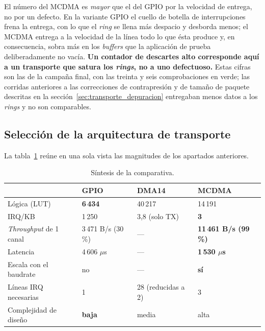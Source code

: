 El número del MCDMA es \textit{mayor} que el del GPIO por la velocidad de entrega, no por un
defecto. En la variante GPIO el cuello de botella de interrupciones frena la entrega, con lo que
el \textit{ring} se llena más despacio y desborda menos; el MCDMA entrega a la velocidad de la
línea todo lo que ésta produce y, en consecuencia, sobra más en los \textit{buffers} que la
aplicación de prueba deliberadamente no vacía. \textbf{Un contador de descartes alto corresponde
aquí a un transporte que satura los \textit{rings}, no a uno defectuoso.} Estas cifras son las de
la campaña final, con las treinta y seis comprobaciones en verde; las corridas anteriores a las
correcciones de contrapresión y de tamaño de paquete descritas en la
sección~\ref{sec:transporte_depuracion} entregaban menos datos a los \textit{rings} y no son
comparables.

\subsection{Selección de la arquitectura de transporte}

La tabla~\ref{tab:bench_resumen} reúne en una sola vista las magnitudes de los apartados
anteriores.

\begin{table}[H]
    \centering
    \small
    \begin{tabular}{llll}
        \hline
         & \textbf{GPIO} & \textbf{DMA14} & \textbf{MCDMA} \\
        \hline
        Lógica (LUT) & \textbf{6\,434} & 40\,217 & 14\,191 \\
        IRQ/KB & 1\,250 & 3,8 (solo TX) & \textbf{3} \\
        \textit{Throughput} de 1 canal & 3\,471 B/s (30\,\%) & --- & \textbf{11\,461 B/s (99\,\%)} \\
        Latencia & 4\,606 $\mu$s & --- & \textbf{1\,530 $\mu$s} \\
        Escala con el baudrate & no & --- & \textbf{sí} \\
        Líneas IRQ necesarias & 1 & 28 (reducidas a 2) & 3 \\
        Complejidad de diseño & \textbf{baja} & media & alta \\
        \hline
    \end{tabular}
    \caption{Síntesis de la comparativa.}
    \label{tab:bench_resumen}
\end{table}

